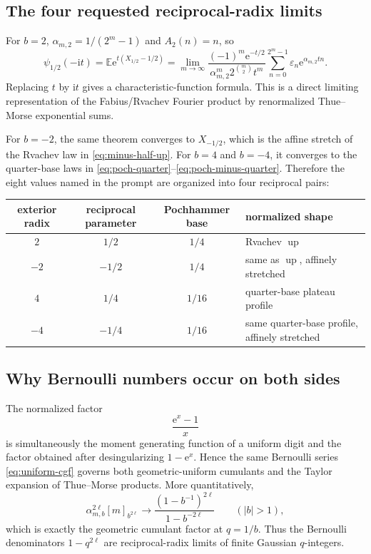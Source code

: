 \documentclass[11pt,oneside]{article}
\theoremstyle{definition}
\theoremstyle{remark}
\newcommand{\E}{\mathbb E}
\newcommand{\Up}{\operatorname{up}}
\newcommand{\ii}{\mathrm i}
\newcommand{\e}{\mathrm e}
\newcommand{\epsTM}{\varepsilon}
\begin{document}
\subsection{The four requested reciprocal-radix limits}
For \(b=2\), \(\alpha_{m,2}=1/(2^m-1)\) and \(A_2(n)=n\), so
\begin{equation}\label{eq:fabius-thue-limit}
 \psi_{1/2}(-\ii t)
 =\E\e^{t(X_{1/2}-1/2)}
 =\lim_{m\to\infty}
 \frac{(-1)^m\e^{-t/2}}
 {\alpha_{m,2}^m2^{\binom m2}t^m}
 \sum_{n=0}^{2^m-1}\epsTM_n\e^{\alpha_{m,2}tn}.
\end{equation}
Replacing \(t\) by \(\ii t\) gives a characteristic-function formula.  This
is a direct limiting representation of the Fabius/Rvachev Fourier product by
renormalized Thue--Morse exponential sums.

For \(b=-2\), the same theorem converges to \(X_{-1/2}\), which is the affine
stretch of the Rvachev law in \eqref{eq:minus-half-up}.  For \(b=4\) and
\(b=-4\), it converges to the quarter-base laws in
\eqref{eq:poch-quarter}--\eqref{eq:poch-minus-quarter}.  Therefore the eight
values named in the prompt are organized into four reciprocal pairs:
\begin{center}
\begin{tabularx}{0.96\textwidth}{@{}ccc>{\raggedright\arraybackslash}X@{}}
\toprule
exterior radix & reciprocal parameter & Pochhammer base & normalized shape \\
\midrule
\(2\) & \(1/2\) & \(1/4\) & Rvachev \(\Up\) \\
\(-2\) & \(-1/2\) & \(1/4\) & same as \(\Up\), affinely stretched \\
\(4\) & \(1/4\) & \(1/16\) & quarter-base plateau profile \\
\(-4\) & \(-1/4\) & \(1/16\) & same quarter-base profile, affinely stretched \\
\bottomrule
\end{tabularx}
\end{center}

\subsection{Why Bernoulli numbers occur on both sides}
The normalized factor
\[
 \frac{\e^x-1}{x}
\]
is simultaneously the moment generating function of a uniform digit and the
factor obtained after desingularizing \(1-\e^x\).  Hence the same Bernoulli
series \eqref{eq:uniform-cgf} governs both geometric-uniform cumulants and the
Taylor expansion of Thue--Morse products.  More quantitatively,
\begin{equation}\label{eq:qinteger-limit}
 \alpha_{m,b}^{2\ell}[m]_{b^{2\ell}}
 \longrightarrow
 \frac{(1-b^{-1})^{2\ell}}{1-b^{-2\ell}}
 \qquad(|b|>1),
\end{equation}
which is exactly the geometric cumulant factor at \(q=1/b\).  Thus the
Bernoulli denominators \(1-q^{2\ell}\) are reciprocal-radix limits of finite
Gaussian \(q\)-integers.
\end{document}
